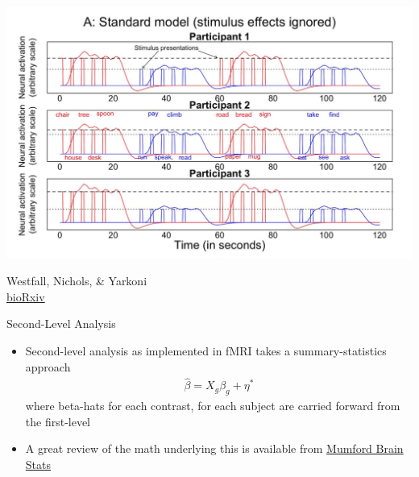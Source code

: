 \documentclass[t,12pt]{beamer}
\begin{document}
\begin{frame}{}
\vspace{20pt}
\centering
\includegraphics[width=\textwidth]{images/westfall_biorxiv.png} \\
\vspace{-10pt}
\begin{block}{}
Westfall, Nichols, \& Yarkoni \\ \href{http://biorxiv.org/content/early/2016/10/12/077131}{bioRxiv}
\end{block}
\end{frame}

\begin{frame}{Second-Level Analysis}
\vspace{10pt}
\begin{itemize}
\setlength\itemsep{1em}
\item Second-level analysis as implemented in fMRI takes a summary-statistics approach
\begin{eqnarray*}
\hat{\beta} = X_{g}\beta_{g} + \eta^{*}
\end{eqnarray*}
where beta-hats for each contrast, for each subject are carried forward from the first-level
\item A great review of the math underlying this is available from \href{http://mumfordbrainstats.tumblr.com/post/128184717456/day-22-the-2-stage-summary-statistics-model-with}{Mumford Brain Stats}
\end{itemize}
\end{frame}
\end{document}
